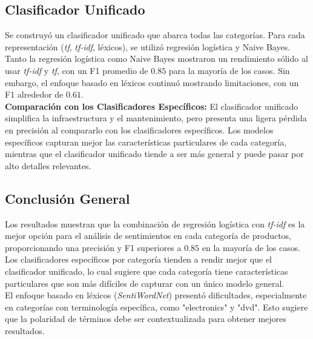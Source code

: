 \documentclass[11pt,english]{article}
\theoremstyle{plain}
\begin{document}
\subsection{Clasificador Unificado}

Se construyó un clasificador unificado que abarca todas las categorías. Para cada representación (\textit{tf}, \textit{tf-idf}, léxicos), se utilizó regresión logística y Naive Bayes.\\

\noindent Tanto la regresión logística como Naive Bayes mostraron un rendimiento sólido al usar \textit{tf-idf} y \textit{tf}, con un F1 promedio de $0.85$ para la mayoría de los casos. Sin embargo, el enfoque basado en léxicos continuó mostrando limitaciones, con un F1 alrededor de $0.61$.\\

\noindent \textbf{Comparación con los Clasificadores Específicos:} El clasificador unificado simplifica la infraestructura y el mantenimiento, pero presenta una ligera pérdida en precisión al compararlo con los clasificadores específicos. Los modelos específicos capturan mejor las características particulares de cada categoría, mientras que el clasificador unificado tiende a ser más general y puede pasar por alto detalles relevantes.

\subsection{Conclusión General}

Los resultados muestran que la combinación de regresión logística con \textit{tf-idf} es la mejor opción para el análisis de sentimientos en cada categoría de productos, proporcionando una precisión y F1 superiores a $0.85$ en la mayoría de los casos. Los clasificadores específicos por categoría tienden a rendir mejor que el clasificador unificado, lo cual sugiere que cada categoría tiene características particulares que son más difíciles de capturar con un único modelo general.\\

\noindent El enfoque basado en léxicos (\textit{SentiWordNet}) presentó dificultades, especialmente en categorías con terminología específica, como "electronics" y "dvd". Esto sugiere que la polaridad de términos debe ser contextualizada para obtener mejores resultados.\\

\printbibliography
\end{document}
